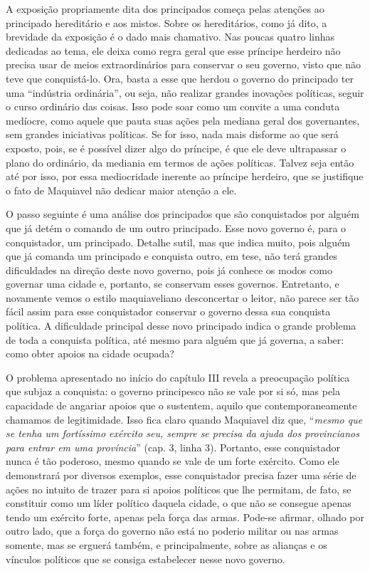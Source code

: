 A exposição propriamente dita dos principados começa pelas atenções ao
principado hereditário e aos mistos. Sobre os hereditários, como já
dito, a brevidade da exposição é o dado mais chamativo. Nas poucas
quatro linhas dedicadas ao tema, ele deixa como regra geral que esse
príncipe herdeiro não precisa usar de meios extraordinários para
conservar o seu governo, visto que não teve que conquistá-lo. Ora, basta
a esse que herdou o governo do principado ter uma ``indústria
ordinária'', ou seja, não realizar grandes inovações políticas, seguir o
curso ordinário das coisas. Isso pode soar como um convite a uma conduta
medíocre, como aquele que pauta suas ações pela mediana geral dos
governantes, sem grandes iniciativas políticas. Se for isso, nada mais
disforme ao que será exposto, pois, se é possível dizer algo do
príncipe, é que ele deve ultrapassar o plano do ordinário, da mediania
em termos de ações políticas. Talvez seja então até por isso, por essa
mediocridade inerente ao príncipe herdeiro, que se justifique o fato de
Maquiavel não dedicar maior atenção a ele.

O passo seguinte é uma análise dos principados que são conquistados por
alguém que já detém o comando de um outro principado. Esse novo governo
é, para o conquistador, um principado. Detalhe sutil, mas que indica
muito, pois alguém que já comanda um principado e conquista outro, em
tese, não terá grandes dificuldades na direção deste novo governo, pois
já conhece os modos como governar uma cidade e, portanto, se conservam
esses governos. Entretanto, e novamente vemos o estilo maquiaveliano
desconcertar o leitor, não parece ser tão fácil assim para esse
conquistador conservar o governo dessa sua conquista política. A
dificuldade principal desse novo principado indica o grande problema de
toda a conquista política, até mesmo para alguém que já governa, a
saber: como obter apoios na cidade ocupada?

O problema apresentado no início do capítulo III revela a preocupação
política que subjaz a conquista: o governo principesco não se vale por
si só, mas pela capacidade de angariar apoios que o sustentem, aquilo
que contemporaneamente chamamos de legitimidade. Isso fica claro quando
Maquiavel diz que, ``\emph{mesmo que se tenha um fortíssimo exército
seu, sempre se precisa da ajuda dos provincianos para entrar em uma
província}'' (cap. 3, linha 3). Portanto, esse conquistador nunca é tão
poderoso, mesmo quando se vale de um forte exército. Como ele
demonstrará por diversos exemplos, esse conquistador precisa fazer uma
série de ações no intuito de trazer para si apoios políticos que lhe
permitam, de fato, se constituir como um líder político daquela cidade,
o que não se consegue apenas tendo um exército forte, apenas pela força
das armas. Pode-se afirmar, olhado por outro lado, que a força do
governo não está no poderio militar ou nas armas somente, mas se erguerá
também, e principalmente, sobre as alianças e os vínculos políticos que
se consiga estabelecer nesse novo governo.

